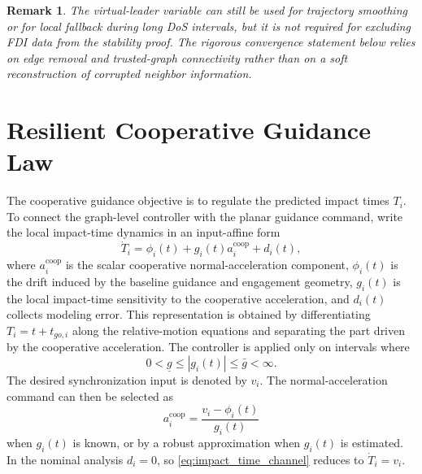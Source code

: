 \documentclass[lettersize,journal]{IEEEtran}
\newtheorem{remark}{Remark}
\begin{document}
\begin{remark}
The virtual-leader variable can still be used for trajectory smoothing or for local fallback during long DoS intervals, but it is not required for excluding FDI data from the stability proof. The rigorous convergence statement below relies on edge removal and trusted-graph connectivity rather than on a soft reconstruction of corrupted neighbor information.
\end{remark}

\section{Resilient Cooperative Guidance Law}

The cooperative guidance objective is to regulate the predicted impact times $T_i$. To connect the graph-level controller with the planar guidance command, write the local impact-time dynamics in an input-affine form
\begin{equation}
    \dot T_i
    =
    \phi_i(t)
    +
    g_i(t)a_i^{\mathrm{coop}}
    +
    d_i(t),
    \label{eq:impact_time_channel}
\end{equation}
where $a_i^{\mathrm{coop}}$ is the scalar cooperative normal-acceleration component, $\phi_i(t)$ is the drift induced by the baseline guidance and engagement geometry, $g_i(t)$ is the local impact-time sensitivity to the cooperative acceleration, and $d_i(t)$ collects modeling error. This representation is obtained by differentiating $T_i=t+t_{go,i}$ along the relative-motion equations and separating the part driven by the cooperative acceleration. The controller is applied only on intervals where
\begin{equation}
    0<\underline g\le |g_i(t)|\le \bar g<\infty.
    \label{eq:channel_gain_bound}
\end{equation}
The desired synchronization input is denoted by $v_i$. The normal-acceleration command can then be selected as
\begin{equation}
    a_i^{\mathrm{coop}}
    =
    \frac{v_i-\phi_i(t)}{g_i(t)}
    \label{eq:feedback_linearization}
\end{equation}
when $g_i(t)$ is known, or by a robust approximation when $g_i(t)$ is estimated. In the nominal analysis $d_i=0$, so \eqref{eq:impact_time_channel} reduces to $\dot T_i=v_i$.
\end{document}
